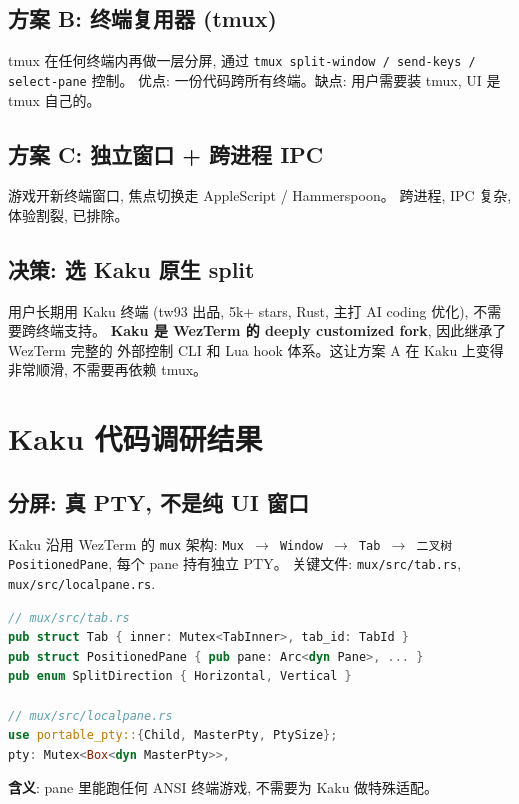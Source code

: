 \documentclass[11pt]{article}
\begin{document}
\subsection{方案 B: 终端复用器 (tmux)}

tmux 在任何终端内再做一层分屏, 通过 \texttt{tmux split-window / send-keys / select-pane} 控制。
优点: 一份代码跨所有终端。缺点: 用户需要装 tmux, UI 是 tmux 自己的。

\subsection{方案 C: 独立窗口 + 跨进程 IPC}

游戏开新终端窗口, 焦点切换走 AppleScript / Hammerspoon。
跨进程, IPC 复杂, 体验割裂, 已排除。

\subsection{决策: 选 Kaku 原生 split}

用户长期用 Kaku 终端 (tw93 出品, 5k+ stars, Rust, 主打 AI coding 优化),
不需要跨终端支持。
\textbf{Kaku 是 WezTerm 的 deeply customized fork}, 因此继承了 WezTerm 完整的
外部控制 CLI 和 Lua hook 体系。这让方案 A 在 Kaku 上变得非常顺滑,
不需要再依赖 tmux。

\section{Kaku 代码调研结果}

\subsection{分屏: 真 PTY, 不是纯 UI 窗口}

Kaku 沿用 WezTerm 的 \texttt{mux} 架构:
\texttt{Mux $\to$ Window $\to$ Tab $\to$ 二叉树 PositionedPane},
每个 pane 持有独立 PTY。
关键文件: \texttt{mux/src/tab.rs}, \texttt{mux/src/localpane.rs}.

\begin{lstlisting}[language=Rust]
// mux/src/tab.rs
pub struct Tab { inner: Mutex<TabInner>, tab_id: TabId }
pub struct PositionedPane { pub pane: Arc<dyn Pane>, ... }
pub enum SplitDirection { Horizontal, Vertical }

// mux/src/localpane.rs
use portable_pty::{Child, MasterPty, PtySize};
pty: Mutex<Box<dyn MasterPty>>,
\end{lstlisting}

\textbf{含义}: pane 里能跑任何 ANSI 终端游戏, 不需要为 Kaku 做特殊适配。
\end{document}
